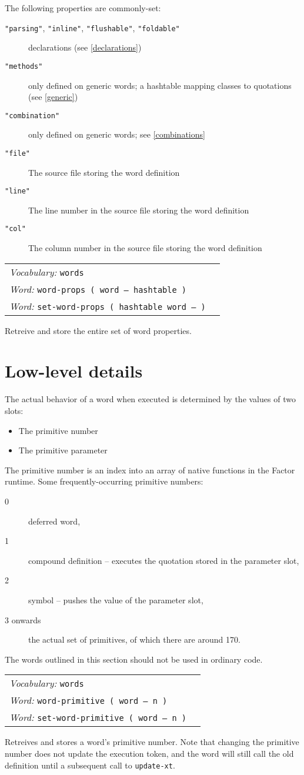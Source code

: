 \documentclass{book}
\newcommand{\vocabulary}[1]{\emph{Vocabulary:} \texttt{#1}&\\}
\newcommand{\ordinaryword}[2]{\index{\texttt{#1}}\emph{Word:} \texttt{#2}&\\}
\newcommand{\wordtable}[1]{


\begin{tabularx}{12cm}{lX}
\hline
#1
\hline
\end{tabularx}

}
\begin{document}
The following properties are commonly-set:

\begin{description}
\item[\texttt{"parsing"}, \texttt{"inline"}, \texttt{"flushable"}, \texttt{"foldable"}] declarations (see \ref{declarations})
\item[\texttt{"methods"}] only defined on generic words; a hashtable mapping classes to quotations (see \ref{generic})
\item[\texttt{"combination"}] only defined on generic words; see \ref{combinations}
\item[\texttt{"file"}] The source file storing the word definition
\item[\texttt{"line"}] The line number in the source file storing the word definition
\item[\texttt{"col"}] The column number in the source file storing the word definition
\end{description}

\wordtable{
\vocabulary{words}
\ordinaryword{word-props}{word-props ( word -- hashtable )}
\ordinaryword{set-word-props}{set-word-props ( hashtable word -- )}

}
Retreive and store the entire set of word properties.

\section{Low-level details}

The actual behavior of a word when executed is determined by the values of two slots:
\begin{itemize}
\item The primitive number
\item The primitive parameter
\end{itemize}
The primitive number is an index into an array of native functions in the Factor runtime.
Some frequently-occurring primitive numbers:
\begin{description}
\item[0] deferred word,
\item[1] compound definition -- executes the quotation stored in the parameter slot,
\item[2] symbol -- pushes the value of the parameter slot,
\item[3 onwards] the actual set of primitives, of which there are around 170.
\end{description}
The words outlined in this section should not be used in ordinary code.
\wordtable{
\vocabulary{words}
\ordinaryword{word-primitive}{word-primitive ( word -- n )}
\ordinaryword{set-word-primitive}{set-word-primitive ( word -- n )}

}
Retreives and stores a word's primitive number. Note that changing the primitive number does not update the execution token, and the word will still call the old definition until a subsequent call to \verb|update-xt|.
\end{document}
